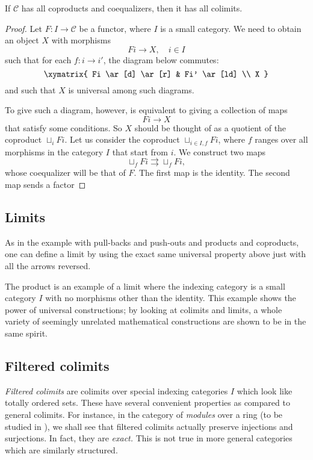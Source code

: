 \begin{theorem} \label{coprodcoequalsufficeforcocomplete}
If $\mathcal{C}$ has all coproducts and coequalizers, then it has all colimits.
\end{theorem}

\begin{proof}
Let $F: I \to \mathcal{C}$ be a functor, where $I$ is a small category. We
need to obtain an object $X$ with morphisms
\[ Fi \to X, \quad i \in I  \]
such that for each $f: i \to i'$, the diagram below commutes:
\[
\xymatrix{
Fi \ar[d] \ar[r] &  Fi' \ar[ld] \\
X
}
\]
and such that $X$ is universal among such diagrams.

To give such a diagram, however, is equivalent to giving a collection of maps
\[ Fi \to X  \]
that satisfy some conditions. So $X$ should be thought of as a quotient of the
coproduct $\sqcup_i Fi$.
Let us consider the coproduct $\sqcup_{i \in I, f} Fi$, where $f$ ranges over
all
morphisms in the category $I$ that start from $i$.
We construct two maps
\[ \sqcup_f Fi \rightrightarrows \sqcup_f Fi,  \]
whose coequalizer will be that of $F$. The first map is the identity. The
second map sends a factor
\end{proof}

\subsection{Limits}
As in the example with pull-backs and push-outs and products and coproducts,
one can define a limit by using the exact same universal property above
just with
all the arrows reversed.

\begin{example} The product is an example of a limit where the indexing
category is a small category $I$ with no morphisms other than the identity. This
example
shows the power of universal constructions; by looking at colimits and limits,
a whole variety of seemingly unrelated mathematical constructions are shown
to be
in the same spirit.
\end{example}

\subsection{Filtered colimits}


\emph{Filtered colimits} are colimits
over special indexing categories $I$ which look like totally ordered sets.
These have several convenient properties as compared to general colimits.
For instance, in the category of \emph{modules} over a ring (to be studied in
), we shall see that filtered colimits actually
preserve injections and surjections. In fact, they are \emph{exact.} This is
not true in more general categories which are similarly structured.



